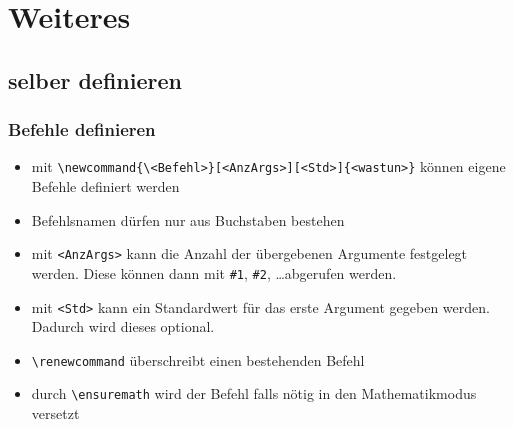 \section{Weiteres}

\subsection{selber definieren}

\begin{frame}[fragile]
\frametitle{Befehle definieren}
\begin{itemize}[<+->]
  \item mit \lstinline[style=Latex]+\newcommand{\<Befehl>}[<AnzArgs>][<Std>]{<wastun>}+ können eigene Befehle definiert werden
  \item Befehlsnamen dürfen nur aus Buchstaben bestehen
  \item mit \texttt{<AnzArgs>} kann die Anzahl der übergebenen Argumente festgelegt werden. Diese können dann mit \lstinline[style=Latex]+#1+, \lstinline[style=Latex]+#2+, \ldots abgerufen werden.
  \item mit \texttt{<Std>} kann ein Standardwert für das erste Argument gegeben werden. Dadurch wird dieses optional.
  \item \lstinline[style=Latex]+\renewcommand+ überschreibt einen bestehenden Befehl
  \item durch \lstinline[style=Latex]+\ensuremath+ wird der Befehl falls nötig in den Mathematikmodus versetzt
\end{itemize}
\end{frame}




